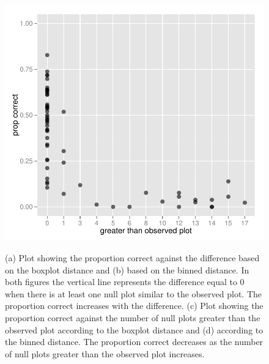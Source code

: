 \documentclass[12]{article}
\begin{document}
\begin{figure}[hbtp]
{\includegraphics[scale=0.55]{turk1-grtr-box-prop.pdf}
\label{t1comp_2}
}
\label{turk1comp}
	\vspace{-.1in}
\caption[Optional caption for list of figures]{(a) Plot showing the proportion correct against the difference based on the boxplot distance and (b) based on the binned distance. In both figures the vertical line represents the difference equal to 0 when there is at least one null plot similar to the observed plot. The proportion correct increases with the difference. (c) Plot showing the proportion correct against the number of null plots greater than the observed plot according to the boxplot distance and (d) according to the binned distance. The proportion correct decreases as the number of null plots greater than the observed plot increases.  }
\end{figure}
\end{document}
